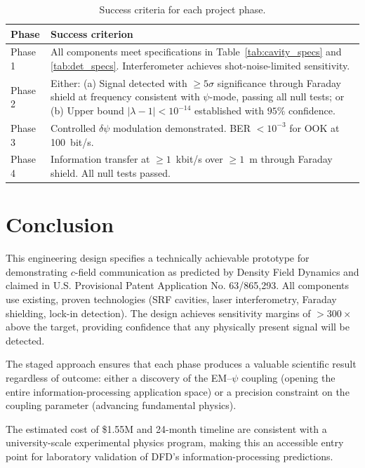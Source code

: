 \documentclass[11pt,letterpaper]{article}
\newcommand{\psifield}{\psi}
\begin{document}
\begin{table}[H]
\centering
\caption{Success criteria for each project phase.}
\label{tab:success}
\begin{tabular}{@{}lp{8cm}@{}}
\toprule
Phase & Success criterion \\
\midrule
Phase 1 & All components meet specifications in Table~\ref{tab:cavity_specs}
  and \ref{tab:det_specs}. Interferometer achieves shot-noise-limited
  sensitivity. \\
Phase 2 & Either: (a) Signal detected with $\geq 5\sigma$ significance
  through Faraday shield at frequency consistent with $\psifield$-mode,
  passing all null tests; or (b) Upper bound
  $|\lambda-1| < 10^{-14}$ established with $95\%$ confidence. \\
Phase 3 & Controlled $\delta\psifield$ modulation demonstrated. BER
  $< 10^{-3}$ for OOK at 100~bit/s. \\
Phase 4 & Information transfer at $\geq 1$~kbit/s over $\geq 1$~m
  through Faraday shield. All null tests passed. \\
\bottomrule
\end{tabular}
\end{table}

\section{Conclusion}
\label{sec:eng_conclusion}

This engineering design specifies a technically achievable prototype
for demonstrating $c$-field communication as predicted by Density
Field Dynamics and claimed in U.S. Provisional Patent Application
No. 63/865,293. All components use existing, proven technologies
(SRF cavities, laser interferometry, Faraday shielding, lock-in
detection). The design achieves sensitivity margins of
$>300\times$ above the target, providing confidence that any
physically present signal will be detected.

The staged approach ensures that each phase produces a valuable
scientific result regardless of outcome: either a discovery of the
EM--$\psifield$ coupling (opening the entire information-processing
application space) or a precision constraint on the coupling
parameter (advancing fundamental physics).

The estimated cost of \$1.55M and 24-month timeline are consistent
with a university-scale experimental physics program, making this
an accessible entry point for laboratory validation of DFD's
information-processing predictions.
\end{document}
